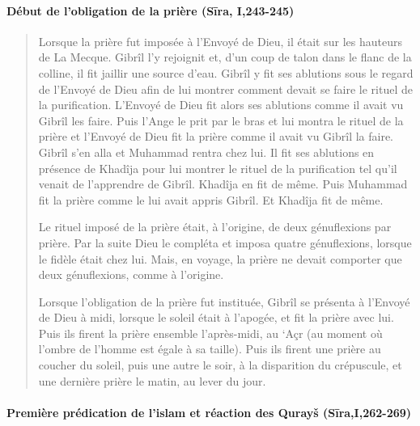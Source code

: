 \paragraph{Début de l'obligation de la prière (Sīra,
I,243-245)}
\begin{quote}
    

{Lorsque la prière fut imposée à l'Envoyé de Dieu, il était sur les
hauteurs de La Mecque. Gibrîl l'y rejoignit et, d'un coup de talon dans
le flanc de la colline, il fit jaillir une source d'eau. Gibrîl y fit
ses ablutions sous le regard de l'Envoyé de Dieu afin de lui montrer
comment devait se faire le rituel de la purification. L'Envoyé de Dieu
fit alors ses ablutions comme il avait vu Gibrîl les faire. Puis l'Ange
le prit par le bras et lui montra le rituel de la prière et l'Envoyé de
Dieu fit la prière comme il avait vu Gibrîl la faire. Gibrîl s'en alla
et Muhammad rentra chez lui. Il fit ses ablutions en présence de Khadîja
pour lui montrer le rituel de la purification tel qu'il venait de
l'apprendre de Gibrîl. Khadîja en fit de même. Puis Muhammad fit la
prière comme le lui avait appris Gibrîl. Et Khadîja fit de même.}


{Le rituel imposé de la prière était, à l'origine, de deux
génuflexions par prière. Par la suite Dieu le compléta et imposa quatre
génuflexions, lorsque le fidèle était chez lui. Mais, en voyage, la
prière ne devait comporter que deux génuflexions, comme à l'origine.}

{Lorsque l'obligation de la prière fut instituée, Gibrîl se
présenta à l'Envoyé de Dieu à midi, lorsque le soleil était à l'apogée,
et fit la prière avec lui. Puis ils firent la prière ensemble
l'après-midi, au `Açr (au moment où l'ombre de l'homme est égale à sa
taille). Puis ils firent une prière au coucher du soleil, puis une autre
le soir, à la disparition du crépuscule, et une dernière prière le
matin, au lever du jour.}
\end{quote}

\paragraph{Première prédication de l'islam et réaction des Qurayš
(Sīra,I,262-269)}

